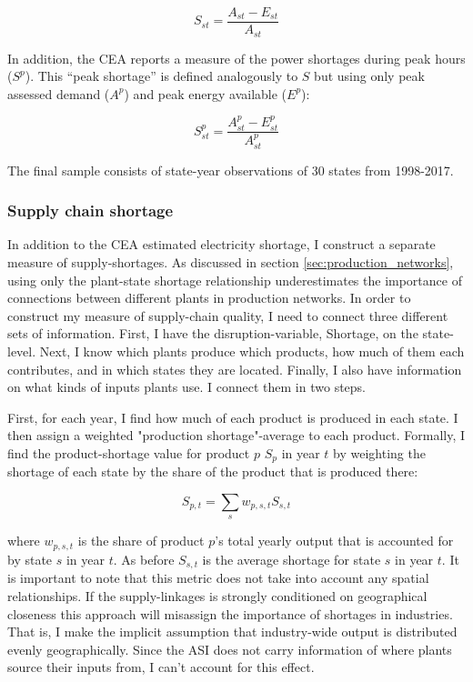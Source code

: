 \documentclass[11pt]{article}
\begin{document}
\[
S_{st} = \frac{A_{st} - E_{st} }{A_{st}}
\]

In addition, the CEA reports a measure of the power shortages during peak hours (\(S^p\)). This ``peak shortage'' is defined analogously to \(S\) but using only peak assessed demand (\(A^{p}\)) and peak energy available (\(E^p\)):

\[
S^{p}_{st} = \frac{A^{p}_{st} - E^{p}_{st}}{A^{p}_{st}}
\]

The final sample consists of state-year observations of 30 states from 1998-2017. 

\subsubsection{Supply chain shortage}%
\label{sub:supply_chain_quality}

In addition to the CEA estimated electricity shortage, I construct a separate measure of supply-shortages. As discussed in section \ref{sec:production_networks}, using only the plant-state shortage relationship underestimates the importance of connections between different plants in production networks. In order to construct my measure of supply-chain quality, I need to connect three different sets of information. First, I have the disruption-variable, Shortage, on the state-level. Next, I know which plants produce which products, how much of them each contributes, and in which states they are located. Finally, I also have information on what kinds of inputs plants use. I connect them in two steps.

First, for each year, I find how much of each product is produced in each state. I then assign a weighted "production shortage"-average to each product. Formally, I find the product-shortage value for product $p$ $S_{p}$ in year $t$ by weighting the shortage of each state by the share of the product that is produced there:

\[
S_{p,t} =  \sum_s w_{p,s,t} S_{s,t}
\]

where $w_{p,s,t}$ is the share of product $p$'s total yearly output that is accounted for by state $s$ in year $t$. As before $S_{s,t}$ is the average shortage for state $s$ in year $t$. It is important to note that this metric does not take into account any spatial relationships. If the supply-linkages is strongly conditioned on geographical closeness this approach will misassign the importance of shortages in industries. That is, I make the implicit assumption that industry-wide output is distributed evenly geographically. Since the ASI does not carry information of where plants source their inputs from, I can't account for this effect.
\end{document}
